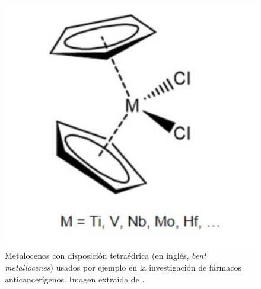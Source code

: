 \begin{itemize}
        \begin{figure}[h!]
            \centering
            \includegraphics[scale=0.4]{imagenes/bent_metallocene.png}
            \caption{Metalocenos con disposición tetraédrica (en inglés, \textit{bent metallocenes}) usados por ejemplo en la investigación de fármacos anticancerígenos. Imagen extraída de \cite{bent_metallocenes}.}
            \label{fig:enter-label}
        \end{figure}
    
\end{itemize}
